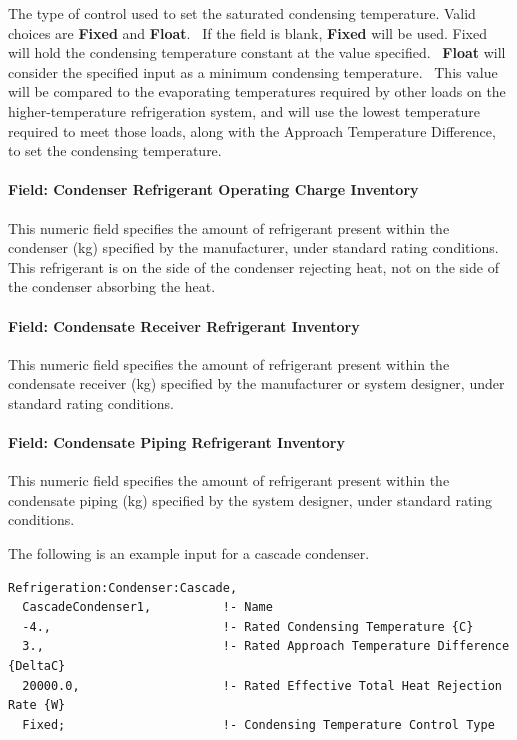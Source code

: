 The type of control used to set the saturated condensing temperature. Valid choices are \textbf{Fixed} and \textbf{Float}.~ If the field is blank, \textbf{Fixed} will be used. Fixed will hold the condensing temperature constant at the value specified.~ \textbf{Float} will consider the specified input as a minimum condensing temperature.~ This value will be compared to the evaporating temperatures required by other loads on the higher-temperature refrigeration system, and will use the lowest temperature required to meet those loads, along with the Approach Temperature Difference, to set the condensing temperature.

\paragraph{Field: Condenser Refrigerant Operating Charge Inventory}\label{field-condenser-refrigerant-operating-charge-inventory-3}

This numeric field specifies the amount of refrigerant present within the condenser (kg) specified by the manufacturer, under standard rating conditions. This refrigerant is on the side of the condenser rejecting heat, not on the side of the condenser absorbing the heat.

\paragraph{Field: Condensate Receiver Refrigerant Inventory}\label{field-condensate-receiver-refrigerant-inventory-3}

This numeric field specifies the amount of refrigerant present within the condensate receiver (kg) specified by the manufacturer or system designer, under standard rating conditions.

\paragraph{Field: Condensate Piping Refrigerant Inventory}\label{field-condensate-piping-refrigerant-inventory-3}

This numeric field specifies the amount of refrigerant present within the condensate piping (kg) specified by the system designer, under standard rating conditions.

The following is an example input for a cascade condenser.

\begin{lstlisting}
Refrigeration:Condenser:Cascade,
  CascadeCondenser1,          !- Name
  -4.,                        !- Rated Condensing Temperature {C}
  3.,                         !- Rated Approach Temperature Difference {DeltaC}
  20000.0,                    !- Rated Effective Total Heat Rejection Rate {W}
  Fixed;                      !- Condensing Temperature Control Type
\end{lstlisting}

